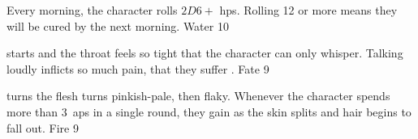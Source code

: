\begin{multicols}{2}
{  Every morning, the character rolls $2D6 +$ \glspl{hp}.
  Rolling 12 or more means they will be cured by the next morning.}%
  {Water}%
  {10}

%
  {starts and the throat feels so tight that the character can only whisper.
  Talking loudly inflicts so much pain, that they suffer .}%
  {Fate}%
  {9}

%
  {turns the flesh turns pinkish-pale, then flaky.
  Whenever the character spends more than 3~\glspl{ap} in a single round, they gain  as the skin splits and hair begins to fall out.}%
  {Fire}%
  {9}

\end{multicols}
